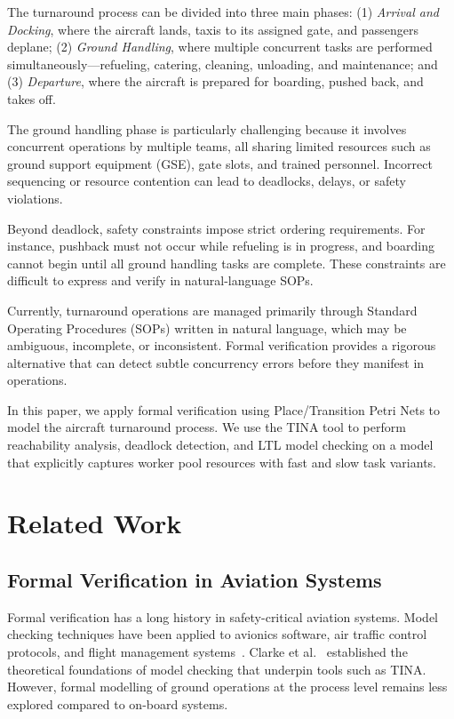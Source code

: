 \documentclass[conference,a4paper]{IEEEtran}
\begin{document}
The turnaround process can be divided into three main phases: (1)
\emph{Arrival and Docking}, where the aircraft lands, taxis to its assigned
gate, and passengers deplane; (2) \emph{Ground Handling}, where multiple
concurrent tasks are performed simultaneously---refueling, catering,
cleaning, unloading, and maintenance; and (3) \emph{Departure}, where the
aircraft is prepared for boarding, pushed back, and takes off.

The ground handling phase is particularly challenging because it involves
concurrent operations by multiple teams, all sharing limited resources such
as ground support equipment (GSE), gate slots, and trained personnel.
Incorrect sequencing or resource contention can lead to deadlocks, delays,
or safety violations.

Beyond deadlock, safety constraints impose strict ordering requirements. For
instance, pushback must not occur while refueling is in progress, and
boarding cannot begin until all ground handling tasks are complete. These
constraints are difficult to express and verify in natural-language SOPs.

Currently, turnaround operations are managed primarily through Standard
Operating Procedures (SOPs) written in natural language, which may be
ambiguous, incomplete, or inconsistent. Formal verification provides a
rigorous alternative that can detect subtle concurrency errors before they
manifest in operations.

In this paper, we apply formal verification using Place/Transition Petri
Nets to model the aircraft turnaround process. We use the TINA tool to
perform reachability analysis, deadlock detection, and LTL model checking on
a model that explicitly captures worker pool resources with fast and slow
task variants.

\section{Related Work}

\subsection{Formal Verification in Aviation Systems}

Formal verification has a long history in safety-critical aviation systems.
Model checking techniques have been applied to avionics software, air
traffic control protocols, and flight management systems~\cite{ref6,ref7}.
Clarke et al.~\cite{ref6} established the theoretical foundations of model
checking that underpin tools such as TINA. However, formal modelling of
ground operations at the process level remains less explored compared to
on-board systems.
\end{document}
